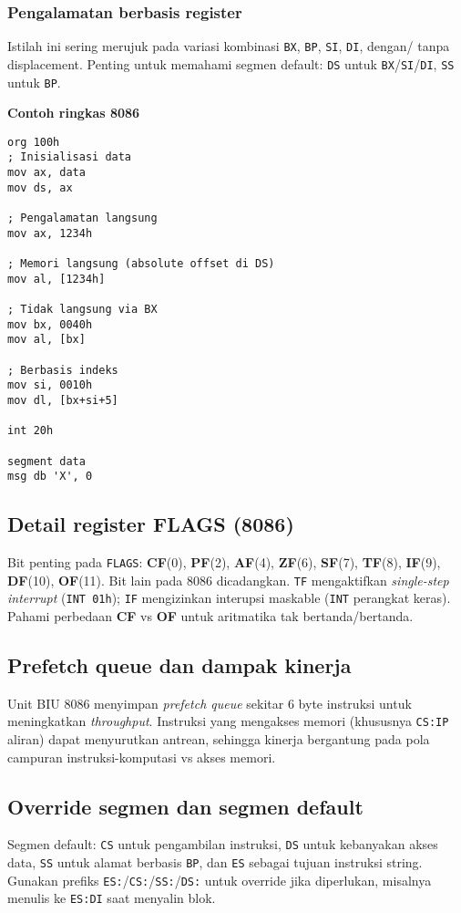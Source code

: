 \subsubsection{Pengalamatan berbasis register}
Istilah ini sering merujuk pada variasi kombinasi \texttt{BX}, \texttt{BP}, \texttt{SI}, \texttt{DI}, dengan/ tanpa displacement. Penting untuk memahami segmen default: \texttt{DS} untuk \texttt{BX}/\texttt{SI}/\texttt{DI}, \texttt{SS} untuk \texttt{BP}.

\noindent\textbf{Contoh ringkas 8086}
\begin{verbatim}
org 100h
; Inisialisasi data
mov ax, data
mov ds, ax

; Pengalamatan langsung
mov ax, 1234h

; Memori langsung (absolute offset di DS)
mov al, [1234h]

; Tidak langsung via BX
mov bx, 0040h
mov al, [bx]

; Berbasis indeks
mov si, 0010h
mov dl, [bx+si+5]

int 20h

segment data
msg db 'X', 0
\end{verbatim}
\subsection{Detail register FLAGS (8086)}
Bit penting pada \texttt{FLAGS}: \textbf{CF}(0), \textbf{PF}(2), \textbf{AF}(4), \textbf{ZF}(6), \textbf{SF}(7), \textbf{TF}(8), \textbf{IF}(9), \textbf{DF}(10), \textbf{OF}(11). Bit lain pada 8086 dicadangkan. \texttt{TF} mengaktifkan \textit{single-step interrupt} (\texttt{INT 01h}); \texttt{IF} mengizinkan interupsi maskable (\texttt{INT} perangkat keras). Pahami perbedaan \textbf{CF} vs \textbf{OF} untuk aritmatika tak bertanda/bertanda. \cite{intel2019manual32,wiki_8086}

\subsection{Prefetch queue dan dampak kinerja}
Unit BIU 8086 menyimpan \textit{prefetch queue} sekitar 6 byte instruksi untuk meningkatkan \textit{throughput}. Instruksi yang mengakses memori (khususnya \texttt{CS:IP} aliran) dapat menyurutkan antrean, sehingga kinerja bergantung pada pola campuran instruksi-komputasi vs akses memori. \cite{wiki_8086}

\subsection{Override segmen dan segmen default}
Segmen default: \texttt{CS} untuk pengambilan instruksi, \texttt{DS} untuk kebanyakan akses data, \texttt{SS} untuk alamat berbasis \texttt{BP}, dan \texttt{ES} sebagai tujuan instruksi string. Gunakan prefiks \texttt{ES:}/\texttt{CS:}/\texttt{SS:}/\texttt{DS:} untuk override jika diperlukan, misalnya menulis ke \texttt{ES:DI} saat menyalin blok. \cite{intel2019manual32}


